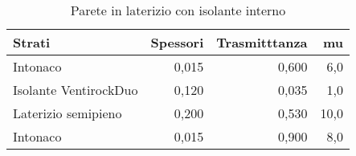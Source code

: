 \begin{table}
\centering
\caption{Parete in laterizio con isolante interno}
\begin{tabular}{lrrr}
\toprule
                Strati & Spessori & Trasmitttanza &    mu \\
\midrule
              Intonaco &    0,015 &         0,600 &   6,0 \\
 Isolante VentirockDuo &    0,120 &         0,035 &   1,0 \\
   Laterizio semipieno &    0,200 &         0,530 &  10,0 \\
              Intonaco &    0,015 &         0,900 &   8,0 \\
\bottomrule
\end{tabular}
\end{table}
